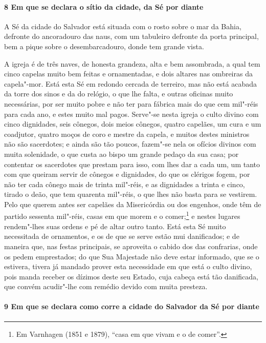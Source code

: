\paragraph{8 Em que se declara o sítio da cidade, da Sé por diante}

A Sé da cidade do Salvador está situada com o rosto sobre o mar da Bahia, defronte do
ancoradouro das naus, com um tabuleiro defronte da porta principal, bem a pique sobre o
desembarcadouro, donde tem grande vista.

A igreja é de três naves, de honesta grandeza, alta e bem assombrada, a qual tem cinco
capelas muito bem feitas e ornamentadas, e dois altares nas ombreiras da capela"-mor. Está
esta Sé em redondo cercada de terreiro, mas não está acabada da torre dos sinos e da do
relógio, o que lhe falta, e outras oficinas muito necessárias, por ser muito pobre e não
ter para fábrica mais do que cem mil"-réis para cada ano, e estes muito mal pagos. Serve"-se
nesta igreja o culto divino com cinco dignidades, seis cônegos, dois meios cônegos, quatro
capelães, um cura e um coadjutor, quatro moços de coro e mestre da capela, e muitos destes
ministros não são sacerdotes; e ainda são tão poucos, fazem"-se nela os ofícios divinos com
muita solenidade, o que custa ao bispo um grande pedaço da sua casa; por contentar os
sacerdotes que prestam para isso, com lhes dar a cada um, um tanto com que queiram servir
de cônegos e dignidades, do que os clérigos fogem, por não ter cada cônego mais de trinta
mil"-réis, e as dignidades a trinta e cinco, tirado o deão, que tem quarenta mil"-réis, o
que lhes não basta para se vestirem. Pelo que querem antes ser capelães da Misericórdia ou
dos engenhos, onde têm de partido sessenta mil"-réis, casas em que morem e o
comer;\footnote{ Em Varnhagen (1851 e 1879), ``casa em que vivam e o de comer''.} e nestes
lugares rendem"-lhes suas ordens e pé de altar outro tanto. Está esta Sé muito necessitada
de ornamentos, e os de que se serve estão mui danificados; e de maneira que, nas festas
principais, se aproveita o cabido dos das confrarias, onde os pedem emprestados; do que
Sua Majestade não deve estar informado, que se o estivera, tivera já mandado prover esta
necessidade em que está o culto divino, pois manda receber os dízimos deste seu Estado,
cuja cabeça está tão danificada, que convém acudir"-lhe com remédio devido com muita
presteza.

\paragraph{9 Em que se declara como corre a cidade do Salvador da Sé por diante}

